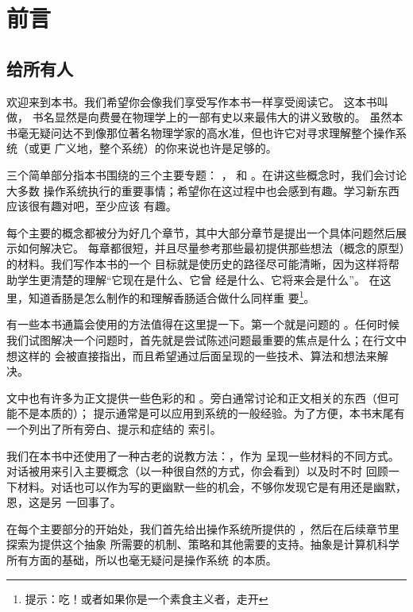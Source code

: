 \chapter*{前言}
{}
\section*{给所有人}
欢迎来到本书。我们希望你会像我们享受写作本书一样享受阅读它。
这本书叫做，
书名显然是向费曼在物理学上的一部有史以来最伟大的讲义致敬的。
虽然本书毫无疑问达不到像那位著名物理学家的高水准，但也许它对寻求理解整个操作系统（或更
广义地，整个系统）的你来说也许是足够的。

三个简单部分指本书围绕的三个主要专题：
，
和
。在讲这些概念时，我们会讨论大多数
操作系统执行的重要事情；希望你在这过程中也会感到有趣。学习新东西应该很有趣对吧，至少应该
有趣。

每个主要的概念都被分为好几个章节，其中大部分章节是提出一个具体问题然后展示如何解决它。
每章都很短，并且尽量参考那些最初提供那些想法（概念的原型）的材料。我们写作本书的一个
目标就是使历史的路径尽可能清晰，因为这样将帮助学生更清楚的理解“它现在是什么、它曾
经是什么、它将来会是什么”。 在这里，知道香肠是怎么制作的和理解香肠适合做什么同样重
要\footnote{提示：吃！或者如果你是一个素食主义者，走开}。

有一些本书通篇会使用的方法值得在这里提一下。第一个就是问题的
。任何时候
我们试图解决一个问题时，首先就是尝试陈述问题最重要的焦点是什么；在行文中
想这样的
会被直接指出，而且希望通过后面呈现的一些技术、算法和想法来解决。

文中也有许多为正文提供一些色彩的和
。旁白通常讨论和正文相关的东西（但可能不是本质的）；
提示通常是可以应用到系统的一般经验。为了方便，本书末尾有一个列出了所有旁白、提示和症结的
索引。

我们在本书中还使用了一种古老的说教方法：，作为
呈现一些材料的不同方式。对话被用来引入主要概念（以一种很自然的方式，你会看到）以及时不时
回顾一下材料。对话也可以作为写的更幽默一些的机会，不够你发现它是有用还是幽默，恩，这是另
一回事了。

在每个主要部分的开始处，我们首先给出操作系统所提供的
，然后在后续章节里探索为提供这个抽象
所需要的机制、策略和其他需要的支持。抽象是计算机科学所有方面的基础，所以也毫无疑问是操作系统
的本质。

